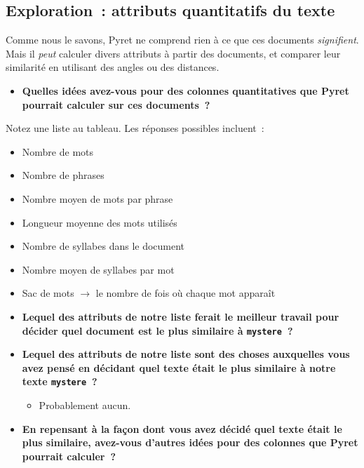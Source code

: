 \documentclass[12pt,a4paper]{article}
\begin{document}
\subsection{Exploration~: attributs quantitatifs du texte}

\begin{thinkbox}
  Comme nous le savons, Pyret ne comprend rien à ce que ces documents \emph{signifient}. Mais il \emph{peut} calculer divers attributs à partir des documents, et comparer leur similarité en utilisant des angles ou des distances.

  \begin{itemize}
    \item \textbf{Quelles idées avez-vous pour des colonnes quantitatives que Pyret pourrait calculer sur ces documents~?}
  \end{itemize}

  Notez une liste au tableau. Les réponses possibles incluent~:
  \begin{itemize}
    \item Nombre de mots
    \item Nombre de phrases
    \item Nombre moyen de mots par phrase
    \item Longueur moyenne des mots utilisés
    \item Nombre de syllabes dans le document
    \item Nombre moyen de syllabes par mot
    \item Sac de mots $\to$ le nombre de fois où chaque mot apparaît
  \end{itemize}

  \begin{itemize}
    \item \textbf{Lequel des attributs de notre liste ferait le meilleur travail pour décider quel document est le plus similaire à \texttt{mystere}~?}
    \item \textbf{Lequel des attributs de notre liste sont des choses auxquelles vous avez pensé en décidant quel texte était le plus similaire à notre texte \texttt{mystere}~?}
    \begin{itemize}
      \item Probablement aucun.
    \end{itemize}
    \item \textbf{En repensant à la façon dont vous avez décidé quel texte était le plus similaire, avez-vous d'autres idées pour des colonnes que Pyret pourrait calculer~?}
  \end{itemize}
\end{thinkbox}
\end{document}
